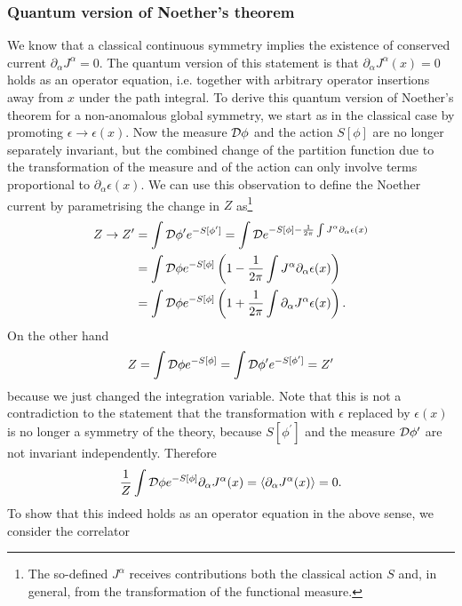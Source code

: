  \subsubsection{Quantum version of Noether's theorem}
 We know that a classical continuous symmetry implies the existence of conserved current $\partial_\alpha J^\alpha =0$. The quantum version of this statement is that $\partial_\alpha J^\alpha(x)=0$ holds as an operator equation, i.e. together with arbitrary operator insertions away from $x$ under the path integral. To derive this quantum version of Noether's theorem for a non-anomalous global symmetry, we start as in the classical case by promoting $\epsilon \rightarrow\epsilon(x)$. Now the measure $\mathcal{D} \phi$ and the action $S[\phi]$ are no longer separately invariant, but the combined change of the partition function due to the transformation of the measure and of the action can only involve terms proportional to $\partial_\alpha \epsilon(x)$. We can use this observation to define the Noether current by parametrising the change in $Z$ as\footnote{The so-defined $J^\alpha$ receives contributions both the classical action $S$ and, in general, from the transformation of the functional measure.}
 \begin{align}
 	Z\rightarrow Z^\prime &= \int \mathcal{D} \phi^\prime e^{-S[\phi^\prime]} = \int \mathcal{D} e^{-S[\phi] -\frac{1}{2 \pi} \int J^\alpha \partial_\alpha \epsilon(x)}  \nonumber \\
 	&= \int \mathcal{D} \phi e^{-S[\phi]} \left(1-\frac{1}{2\pi} \int J^\alpha \partial_\alpha \epsilon(x)\right)\nonumber \\
 	&= \int \mathcal{D} \phi e^{-S[\phi]} \left(1+\frac{1}{2\pi} \int \partial_\alpha J^\alpha \epsilon(x)\right).
 \end{align}
 On the other hand
 \begin{equation}
 Z=\int \mathcal{D} \phi e^{-S[\phi]} = \int \mathcal{D} \phi^\prime e^{-S[\phi^\prime]} = Z^\prime 
 \end{equation}
 because we just changed the integration variable. Note that this is not a contradiction to the statement that the transformation with $\epsilon$ replaced by $\epsilon(x)$ is no longer a symmetry of the theory, because $S[\phi^\prime]$ and the measure $\mathcal{D} \phi^\prime$ are not invariant independently. Therefore
 \begin{equation}
 \frac{1}{Z} \int \mathcal{D} \phi e^{-S[\phi]} \partial_\alpha J^\alpha(x) = \langle \partial_\alpha J^\alpha(x)\rangle =0.
 \end{equation}
 To show that this indeed holds as an operator equation in the above sense, we consider the correlator
